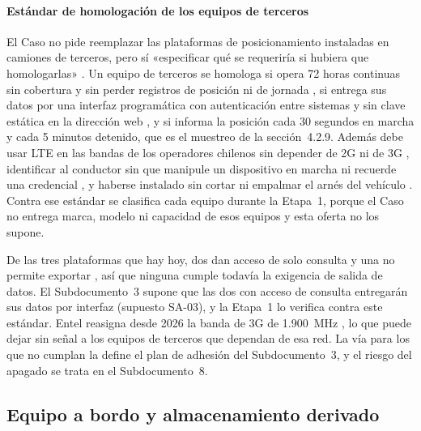 \paragraph{Estándar de homologación de los equipos de terceros} El Caso no pide reemplazar las
plataformas de posicionamiento instaladas en camiones de terceros, pero sí «especificar qué se
requeriría si hubiera que homologarlas» . Un equipo de terceros se homologa si
opera 72 horas continuas sin cobertura y sin perder registros de posición ni de jornada
, si entrega sus datos por una interfaz programática con autenticación entre
sistemas y sin clave estática en la dirección web , y si informa la posición cada
30 segundos en marcha y cada 5 minutos detenido, que es el muestreo de la sección~4.2.9. Además debe
usar LTE en las bandas de los operadores chilenos sin depender de 2G ni de 3G
\parencite{subtel_bandas,df_3g_entel}, identificar al conductor sin que manipule un dispositivo en marcha
ni recuerde una credencial , y haberse instalado sin cortar ni empalmar el arnés del
vehículo . Contra ese estándar se clasifica cada equipo durante la Etapa~1,
porque el Caso no entrega marca, modelo ni capacidad de esos equipos y esta oferta no los supone.

De las tres plataformas que hay hoy, dos dan acceso de solo consulta y una no permite exportar
, así que ninguna cumple todavía la exigencia de salida de datos. El
Subdocumento~3 supone que las dos con acceso de consulta entregarán sus datos por interfaz (supuesto
SA-03), y la Etapa~1 lo verifica contra este estándar. Entel reasigna desde 2026 la banda de 3G de
1.900~MHz \parencite{df_3g_entel}, lo que puede dejar sin señal a los equipos de terceros que dependan
de esa red. La vía para los que no cumplan la define el plan de adhesión del Subdocumento~3, y el riesgo
del apagado se trata en el Subdocumento~8.

\subsection{Equipo a bordo y almacenamiento derivado}\label{sec:4-bordo}

